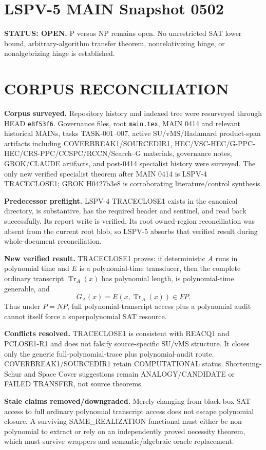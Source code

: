 \documentclass[11pt]{article}\usepackage[margin=.86in]{geometry}\usepackage{amsmath,amssymb}
\begin{document}
\section*{LSPV-5 MAIN Snapshot 0502}
\textbf{STATUS: OPEN.} P versus NP remains open. No unrestricted SAT lower bound, arbitrary-algorithm transfer theorem, nonrelativizing hinge, or nonalgebrizing hinge is established.
\section*{CORPUS RECONCILIATION}
\textbf{Corpus surveyed.} Repository history and indexed tree were resurveyed through HEAD \texttt{e8f53f6}. Governance files, root \texttt{main.tex}, MAIN 0414 and relevant historical MAINs, tasks TASK-001--007, active SU/vMS/Hadamard product-span artifacts including COVERBREAK1/SOURCEDIR1, HEC/VSC-HEC/G-PPC-HEC/CRS-PPC/CCSPC/RCCN/Search--G materials, governance notes, GROK/CLAUDE artifacts, and post-0414 specialist history were surveyed. The only new verified specialist theorem after MAIN 0414 is LSPV-4 TRACECLOSE1; GROK H0427b3e8 is corroborating literature/control synthesis.

\textbf{Predecessor preflight.} LSPV-4 TRACECLOSE1 exists in the canonical directory, is substantive, has the required header and sentinel, and read back successfully. Its report write is verified. Its root owned-region reconciliation was absent from the current root blob, so LSPV-5 absorbs that verified result during whole-document reconciliation.

\textbf{New verified result.} TRACECLOSE1 proves: if deterministic \(A\) runs in polynomial time and \(E\) is a polynomial-time transducer, then the complete ordinary transcript \(\operatorname{Tr}_A(x)\) has polynomial length, is polynomial-time generable, and
\[
G_A(x)=E(x,\operatorname{Tr}_A(x))\in FP.
\]
Thus under \(P=NP\), full polynomial-transcript access plus a polynomial audit cannot itself force a superpolynomial SAT resource.

\textbf{Conflicts resolved.} TRACECLOSE1 is consistent with REACQ1 and PCLOSE1-R1 and does not falsify source-specific SU/vMS structure. It closes only the generic full-polynomial-trace plus polynomial-audit route. COVERBREAK1/SOURCEDIR1 retain COMPUTATIONAL status. Shortening-Schur and Space Cover suggestions remain ANALOGY/CANDIDATE or FAILED TRANSFER, not source theorems.

\textbf{Stale claims removed/downgraded.} Merely changing from black-box SAT access to full ordinary polynomial transcript access does not escape polynomial closure. A surviving SAME_REALIZATION functional must either be non-polynomial to extract or rely on an independently proved necessity theorem, which must survive wrappers and semantic/algebraic oracle replacement.
\end{document}
